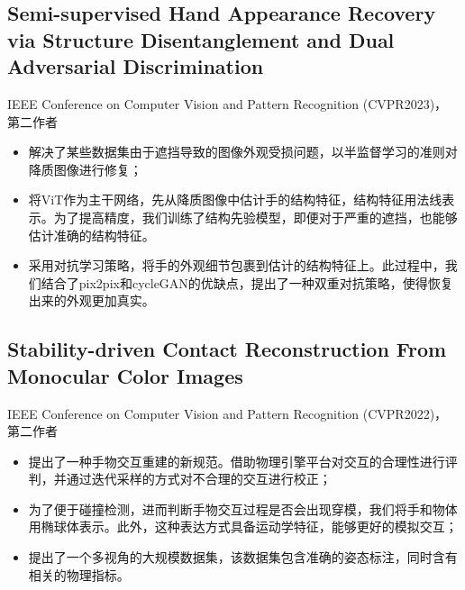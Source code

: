 \documentclass{resume}
\begin{document}
\subsection{\textbf{Semi-supervised Hand Appearance Recovery via Structure Disentanglement and Dual Adversarial Discrimination}}
IEEE Conference on Computer Vision and Pattern Recognition (CVPR2023)， 第二作者
\begin{itemize}
  \item 解决了某些数据集由于遮挡导致的图像外观受损问题，以半监督学习的准则对降质图像进行修复；
  \item 将ViT作为主干网络，先从降质图像中估计手的结构特征，结构特征用法线表示。为了提高精度，我们训练了结构先验模型，即便对于严重的遮挡，也能够估计准确的结构特征。
  \item 采用对抗学习策略，将手的外观细节包裹到估计的结构特征上。此过程中，我们结合了pix2pix和cycleGAN的优缺点，提出了一种双重对抗策略，使得恢复出来的外观更加真实。
\end{itemize}

\subsection{\textbf{Stability-driven Contact Reconstruction From Monocular Color Images}}
IEEE Conference on Computer Vision and Pattern Recognition (CVPR2022)， 第二作者
\begin{itemize}
  \item 提出了一种手物交互重建的新规范。借助物理引擎平台对交互的合理性进行评判，并通过迭代采样的方式对不合理的交互进行校正；
  \item 为了便于碰撞检测，进而判断手物交互过程是否会出现穿模，我们将手和物体用椭球体表示。此外，这种表达方式具备运动学特征，能够更好的模拟交互；
  \item 提出了一个多视角的大规模数据集，该数据集包含准确的姿态标注，同时含有相关的物理指标。
\end{itemize}


\end{document}

